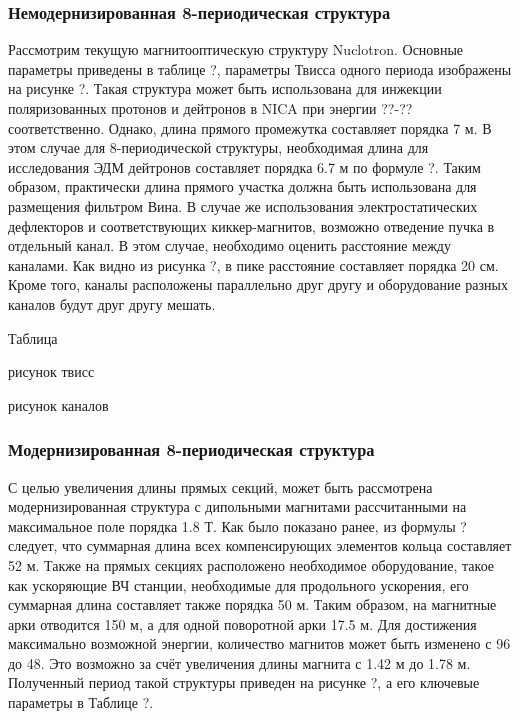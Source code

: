 	\subsubsection{Немодернизированная 8-периодическая структура}\label{sec:EDM/requirements/8period/native}
\par Рассмотрим текущую магнитооптическую структуру Nuclotron. Основные параметры приведены в таблице ?, параметры Твисса одного периода изображены на рисунке ?. Такая структура может быть использована для инжекции поляризованных протонов и дейтронов в NICA при энергии ??-?? соответственно. Однако, длина прямого промежутка составляет порядка 7 м. В этом случае для 8-периодической структуры, необходимая длина для исследования ЭДМ дейтронов составляет порядка 6.7 м по формуле ?. Таким образом, практически длина прямого участка должна быть использована для размещения фильтром Вина. В случае же использования электростатических дефлекторов и соответствующих киккер-магнитов, возможно отведение пучка в отдельный канал. В этом случае, необходимо оценить расстояние между каналами. Как видно из рисунка ?, в пике расстояние составляет порядка 20 см. Кроме того, каналы расположены параллельно друг другу и оборудование разных каналов будут друг другу мешать.

Таблица

рисунок твисс

рисунок каналов
 
	\subsubsection{Модернизированная 8-периодическая структура}\label{sec:EDM/optics/8period/modern}
\par С целью увеличения длины прямых секций, может быть рассмотрена модернизированная структура с дипольными магнитами рассчитанными на максимальное поле порядка 1.8 Т. Как было показано ранее, из формулы ? следует, что суммарная длина всех компенсирующих элементов кольца составляет 52 м. Также на прямых секциях расположено необходимое оборудование, такое как ускоряющие ВЧ станции, необходимые для продольного ускорения, его суммарная длина составляет также порядка 50 м. Таким образом, на магнитные арки отводится 150 м, а для одной поворотной арки 17.5 м. Для достижения максимально возможной энергии, количество магнитов может быть изменено с 96 до 48. Это возможно за счёт увеличения длины магнита с 1.42 м до 1.78 м. Полученный период такой структуры приведен на рисунке ?, а его ключевые параметры в Таблице ?.

